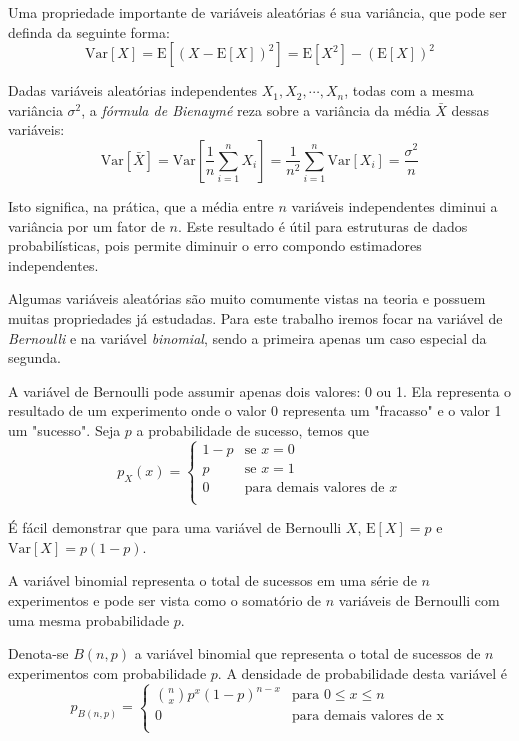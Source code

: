 Uma propriedade importante de variáveis aleatórias é sua variância, que pode ser definda da seguinte forma:
\[
    \text{Var}[X] = \text{E}[(X - \text{E}[X])^2] = \text{E}[X^2] - (\text{E}[X])^2
\]

Dadas variáveis aleatórias independentes $X_1, X_2, \cdots, X_n$, todas com a mesma variância $\sigma^2$, a \emph{fórmula de Bienaymé} reza sobre a variância da média $\bar{X}$ dessas variáveis:
\[
    \text{Var}[\bar{X}] = \text{Var}\left[ \frac{1}{n} \sum_{i=1}^{n} X_i \right] = \frac{1}{n^2} \sum_{i=1}^{n} \text{Var}[X_i]  = \frac{\sigma^2}{n}
\]

Isto significa, na prática, que a média entre $n$ variáveis independentes diminui a variância por um fator de $n$. Este resultado é útil para estruturas de dados probabilísticas, pois permite diminuir o erro compondo estimadores independentes.

Algumas variáveis aleatórias são muito comumente vistas na teoria e possuem muitas propriedades já estudadas. Para este trabalho iremos focar na variável de \emph{Bernoulli} e na variável \emph{binomial}, sendo a primeira apenas um caso especial da segunda.

A variável de Bernoulli pode assumir apenas dois valores: 0 ou 1. Ela representa o resultado de um experimento onde o valor 0 representa um "fracasso" e o valor 1 um "sucesso". Seja $p$ a probabilidade de sucesso, temos que
\[
    p_X(x) = \begin{cases}
        1 - p  & \text{se } x = 0 \\
        p      & \text{se } x = 1 \\
        0      & \text{para demais valores de } x \\
        
    \end{cases}
\]

É fácil demonstrar que para uma variável de Bernoulli $X$, $\text{E}[X] = p$ e $\text{Var}[X] = p (1-p)$.

A variável binomial representa o total de sucessos em uma série de $n$ experimentos e pode ser vista como o somatório de $n$ variáveis de Bernoulli com uma mesma probabilidade $p$.

Denota-se $B(n, p)$ a variável binomial que representa o total de sucessos de $n$ experimentos com probabilidade $p$. A densidade de probabilidade desta variável é
\[
    p_{B(n,p)} = \begin{cases}
        {\binom{n}{x}} p^x(1-p)^{n-x}    & \text{para } 0 \leq x \leq n \\
        0                               & \text{para demais valores de x} \\
    \end{cases}
\]

